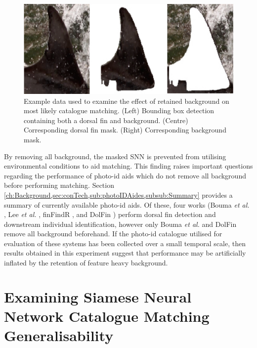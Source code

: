 \begin{figure}
	\begin{center}
		\includegraphics[scale=0.5]{Chapter6/figs/embedding-check-images.jpg}
	\end{center}
	\caption[Example data used to examine the effect of retained background on most likely catalogue matching.]{Example data used to examine the effect of retained background on most likely catalogue matching. (Left) Bounding box detection containing both a dorsal fin and background. (Centre) Corresponding dorsal fin mask. (Right) Corresponding background mask.}
	\label{fig:bboxvsmask}
\end{figure}

By removing all background, the masked SNN is prevented from utilising environmental conditions to aid matching. This finding raises important questions regarding the performance of photo-id aids which do not remove all background before performing matching. Section \ref{ch:Background,sec:conTech,sub:photoIDAides,subsub:Summary} provides a summary of currently available photo-id aids. Of these, four works (Bouma \textit{et al.} \cite{bouma_individual_2018}, Lee \textit{et al.} \cite{lee_backbone_2020}, finFindR \cite{thompson_finfindr_2022}, and DolFin \cite{maglietta_dolfin_2018}) perform dorsal fin detection and downstream individual identification, however only Bouma \textit{et al.} and DolFin remove all background beforehand. If the photo-id catalogue utilised for evaluation of these systems has been collected over a small temporal scale, then results obtained in this experiment suggest that performance may be artificially inflated by the retention of feature heavy background. 

\section{Examining Siamese Neural Network Catalogue Matching Generalisability }\label{ch:SNNEvaluation,sec:SDRP}

